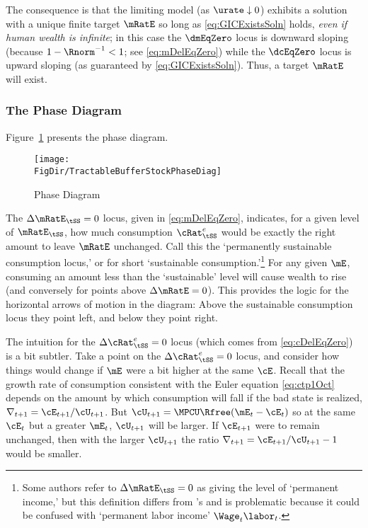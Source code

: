 \documentclass{\handout}
\begin{document}
The consequence is that the limiting model (as $\urate \downarrow 0$) exhibits a solution with a unique finite target $\mRatE$ so long as \eqref{eq:GICExistsSoln} holds, {\it even if human wealth is infinite}; in this case the $\dmEqZero$ locus is downward sloping (because $1-\Rnorm^{-1}<1$; see \eqref{eq:mDelEqZero}) while the $\dcEqZero$ locus is upward sloping (as guaranteed by \eqref{eq:GICExistsSoln}).  Thus, a target $\mRatE$ will exist.


\subsubsection{The Phase Diagram}

Figure~\ref{fig:PhaseDiag} presents the phase diagram.
\begin{figure}
\caption{Phase Diagram}\label{fig:PhaseDiag}
\texttt{[image: \\FigDir/TractableBufferStockPhaseDiag]}
\end{figure}

The $\Delta \mRatE_{\tSS} = 0$ locus, given in \eqref{eq:mDelEqZero}, indicates, for a given level of $\mRatE_{\tSS}$, how much consumption ${\cRat}^{e}_{\tSS}$ would be exactly the right amount to leave $\mRatE$ unchanged.  Call this the `permanently sustainable consumption locus,' or for short `sustainable consumption.'\footnote{Some authors refer to $\Delta \mRatE_{\tSS} = 0$ as giving the level of `permanent income,' but this definition differs from \cite{friedmanATheory}'s and is problematic because it could be confused with `permanent labor income' $\Wage_{t} \labor_{t}$.}  For any given $\mE$, consuming an amount less than the `sustainable' level will cause wealth to rise (and conversely for points above $\Delta \mRatE =0$).  This provides the logic for the horizontal arrows of motion in the diagram: Above the sustainable consumption locus they point left, and below they point right.


The intuition for the $\Delta {\cRat}^{e}_{\tSS}=0$ locus (which comes from \eqref{eq:cDelEqZero}) is a bit subtler.  Take a point on the $\Delta {\cRat}^{e}_{\tSS}=0$ locus, and consider how things would change if $\mE$ were a bit higher at the same $\cE$.  Recall that the growth rate of consumption consistent with the Euler equation \eqref{eq:ctp1Oct} depends on the amount by which consumption will fall if the bad state is realized, $\nabla_{t+1} = \cE_{t+1}/\cU_{t+1}$.  But $\cU_{t+1} = \MPCU \Rfree (\mE_{t} - \cE_{t})$ so at the same $\cE_{t}$ but a greater $\mE_{t}$, $\cU_{t+1}$ will be larger.  If $\cE_{t+1}$ were to remain unchanged, then with the larger $\cU_{t+1}$ the ratio $\nabla_{t+1} = \cE_{t+1}/\cU_{t+1}-1$ would be smaller.
\end{document}
